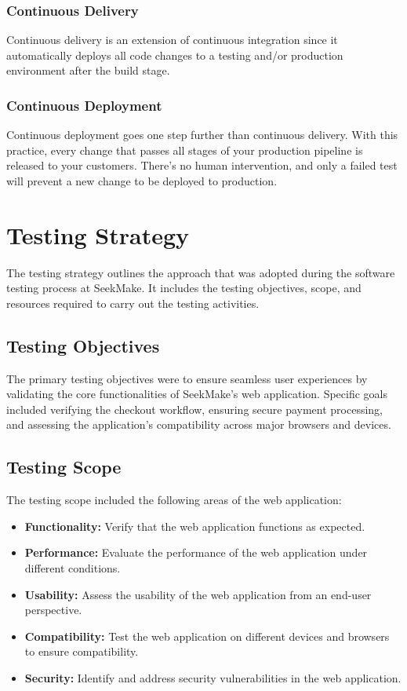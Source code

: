\subsubsection{Continuous Delivery}

Continuous delivery is an extension of continuous integration since it automatically deploys all code changes to a testing and/or production environment after the build stage.\cite{atlassian}

\subsubsection{Continuous Deployment}

Continuous deployment goes one step further than continuous delivery. With this practice, every change that passes all stages of your production pipeline is released to your customers. There's no human intervention, and only a failed test will prevent a new change to be deployed to production. \cite{atlassian}

\section{Testing Strategy}
The testing strategy outlines the approach that was adopted during the software testing process at SeekMake. It includes the testing objectives, scope, and resources required to carry out the testing activities.

\subsection{Testing Objectives}
The primary testing objectives were to ensure seamless user experiences by validating the core functionalities of SeekMake’s web application. Specific goals included verifying the checkout workflow, ensuring secure payment processing, and assessing the application’s compatibility across major browsers and devices.

\subsection{Testing Scope}
The testing scope included the following areas of the web application:

\begin{itemize}
    \item \textbf{Functionality:} Verify that the web application functions as expected.
    \item \textbf{Performance:} Evaluate the performance of the web application under different conditions.
    \item \textbf{Usability:} Assess the usability of the web application from an end-user perspective.
    \item \textbf{Compatibility:} Test the web application on different devices and browsers to ensure compatibility.
    \item \textbf{Security:} Identify and address security vulnerabilities in the web application.
\end{itemize}

